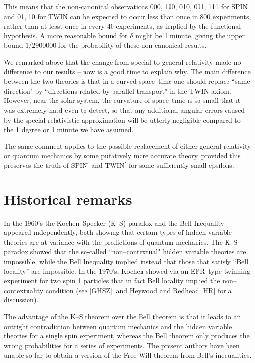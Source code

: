 \documentclass[12pt]{amsart}
\begin{document}
This means that the
non-canonical observations  000, 100, 010, 001, 111 for SPIN and 01, 10 for TWIN
can be expected to occur less than once in 800 experiments, 
rather than at least once in every 40 experiments,
as implied by the functional hypothesis. 
A more reasonable bound for $\delta$ might 
be 1 minute, giving the upper bound $1/2900000$ for 
the probability of these non-canonical results.

We remarked above that the change from special  
to general relativity made no difference to our results -- now
is a good time to explain why.  The main difference between 
the two theories is that in a curved space--time one should 
replace ``same direction" by ``directions related by parallel transport" 
in the TWIN axiom.  However, near the solar
system, the curvature of space--time is so small that it was 
extremely hard even to detect,
so that any additional angular errors caused by the 
special relativistic approximation will be utterly negligible 
compared to the 1 degree or 1 minute we have assumed.

The same comment applies to the possible replacement of either 
general relativity or quantum mechanics by some putatively more 
accurate theory, provided this preserves the truth of SPIN$^\prime$ 
and TWIN$^\prime$ for some sufficiently small epsilons.

\section{Historical remarks}

 In the 1960's the Kochen--Specker (K--S) paradox and the Bell Inequality
appeared independently, both showing that certain types of
hidden variable theories are at variance with the predictions of quantum
mechanics.  The K--S paradox showed that the so-called ``non--contextual"
hidden variable theories are impossible, while the Bell Inequality implied 
instead that those that satisfy ``Bell locality'' are impossible.
In the 1970's, Kochen showed via an EPR--type twinning experiment for two
spin 1 particles that in fact Bell locality implied the
non--contextuality condition (see [GHSZ], and Heywood and Redhead [HR] for a discussion).

The advantage of the K--S theorem over the Bell theorem is that it
leads to an outright contradiction between quantum mechanics and the hidden
variable theories for a single spin experiment, whereas the Bell theorem only
produces the wrong probabilities for a series of experiments. The present 
authors have been unable so far to obtain a version of the Free Will theorem 
from Bell's inequalities.
\end{document}
